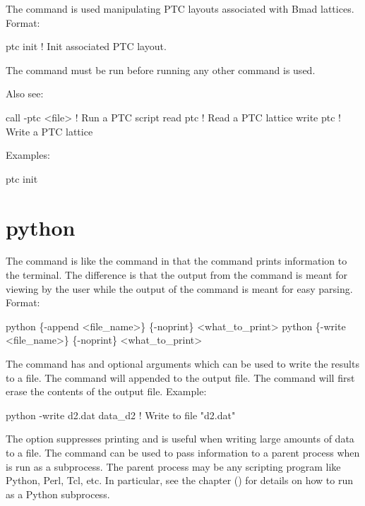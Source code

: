 The  command is used manipulating PTC layouts associated with Bmad
lattices. Format:
\begin{example}
  ptc init            ! Init associated PTC layout.
\end{example}

\vskip 10pt 

The  command must be run before running any other  command is used.

Also see:
\begin{example}
  call -ptc <file>         ! Run a PTC script
  read ptc                 ! Read a PTC lattice
  write ptc                ! Write a PTC lattice
\end{example}

Examples:
\begin{example}
  ptc init
\end{example}

\section{python}
\label{s:python}

The  command is like the  command in that the  command prints
information to the terminal. The difference is that the output from the  command is meant
for viewing by the user while the output of the  command is meant for easy
parsing. Format:
\begin{example}
  python \{-append <file_name>\} \{-noprint\} <what_to_print>
  python \{-write <file_name>\} \{-noprint\} <what_to_print>
\end{example}

The  command has  and  optional arguments which can be used to
write the results to a file. The  command will appended to the output file. The
 command will first erase the contents of the output file. Example:
\begin{example}
  python -write d2.dat data_d2    ! Write to file "d2.dat"
\end{example}

The  option suppresses printing and is useful when writing large amounts of data to a
file.  The  command can be used to pass information to a parent process when \tao is run
as a subprocess.  The parent process may be any scripting program like Python, Perl, Tcl, etc.  In
particular, see the  chapter () for details on how to run
\tao as a Python subprocess.

